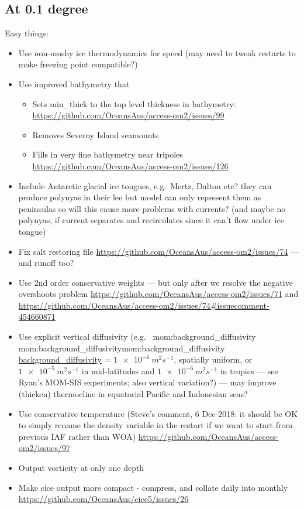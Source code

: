 \documentclass[11pt]{article}
\makeatletter
\newcommand*{\make@hex@label}[1]{%
  \def\hex@label{#1}%
  \@onelevel@sanitize\hex@label
  \EdefEscapeHex\hex@label{\hex@label}%
}
\newcommand*{\hexhyperlink}[2]{%
  \make@hex@label{#1}%
  \hyperlink{\hex@label}{#2}%
}
\newcommand{\momlink}[2]{\hexhyperlink{mom:#2}{#1}}
\newcommand{\paramsty}[1]{\textsf{#1}}
\newcommand{\mom}[1]{\paramsty{\momlink{#1}{#1}}\index{\paramsty{#1}}}
\makeatother
\begin{document}
\subsection{At 0.1 degree}
Easy things:
\begin{itemize}
\item Use non-mushy ice thermodynamics for speed (may need to tweak restarts to make freezing point compatible?)
\item Use improved bathymetry that
\begin{itemize}
\item Sets min_thick to the top level thickness in bathymetry: \url{https://github.com/OceansAus/access-om2/issues/99}
\item Removes Severny Island seamounts
\item Fills in very fine bathymetry near tripoles \url{https://github.com/OceansAus/access-om2/issues/126}
\end{itemize}
\item Include Antarctic glacial ice tongues, e.g.\ Mertz, Dalton etc? they can produce polynyas in their lee but model can only represent them as peninsulas so will this cause more problems with currents? (and maybe no polynyas, if current separates and recirculates since it can't flow under ice tongue)
\item Fix salt restoring file \url{https://github.com/OceansAus/access-om2/issues/74} --- and runoff too?
\item Use 2nd order conservative weights --- but only after we resolve the negative overshoots problem \url{https://github.com/OceansAus/access-om2/issues/71} and \url{https://github.com/OceansAus/access-om2/issues/74#issuecomment-454660871}
\item Use explicit vertical diffusivity (e.g.\ \mom{background_diffusivity} = $\SI{1e-6}{m^2s^{-1}}$, spatially uniform, or $\SI{1e-5}{m^2s^{-1}}$ in mid-latitudes and $\SI{1e-6}{m^2s^{-1}}$ in tropics --- see Ryan's MOM-SIS experiments; also vertical variation?) --- may improve (thicken) thermocline in equatorial Pacific and Indonesian seas?
\item Use conservative temperature (Steve's comment, 6 Dec 2018: it should be OK to simply rename the density variable in the restart if we want to start from previous IAF rather than WOA) \url{https://github.com/OceansAus/access-om2/issues/97}
\item Output vorticity at only one depth
\item Make cice output more compact - compress, and collate daily into monthly \url{https://github.com/OceansAus/cice5/issues/26}

\end{itemize}
\end{document}
